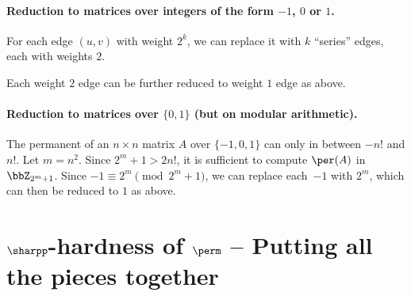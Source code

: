 \documentclass[11pt, a4paper]{article}
\begin{document}
\paragraph*{Reduction to matrices over integers of the form $-1$, $0$ or $1$.}
For each edge $(u,v)$ with weight $2^{k}$,
we can replace it with $k$ ``series'' edges, each with weights $2$.
\begin{center}
\end{center}
Each weight $2$ edge can be further reduced to weight $1$ edge as above.


\paragraph*{Reduction to matrices over $\{0,1\}$ (but on modular arithmetic).}
The permanent of an $n\times n$ matrix $A$ over $\{-1,0,1\}$
can only in between $-n!$ and $n!$.
Let $m=n^2$.
Since $2^{m}+1 > 2n!$,
it is sufficient to compute $\per(A)$ in $\bbZ_{2^m+1}$.
Since $-1\equiv 2^m \pmod {2^m+1}$,
we can replace each~$-1$ with $2^m$, which can then be reduced to $1$ as above.

\section{$\sharpp$-hardness of $\perm$ -- Putting all the pieces together}
\end{document}
